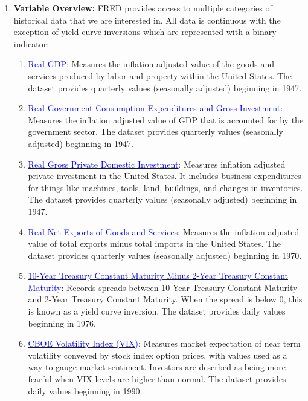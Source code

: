 \documentclass[11pt]{article}
\begin{document}
\begin{enumerate}[itemsep=0em,label={(\alph*)}]
\item \textbf{Variable Overview:} FRED provides access to multiple categories of historical data that we are interested in. All data is continuous with the exception of yield curve inversions which are represented with a binary indicator:
  \begin{enumerate}[itemsep=0em,label={\roman*.}]
    \item \href{https://fred.stlouisfed.org/series/GDPC1}{\underline{\textcolor{blue}{Real GDP}}}: Measures the inflation adjusted value of the goods and services produced by labor and property within the United States. The dataset provides quarterly values (seasonally adjusted) beginning in 1947.
    \item \href{https://fred.stlouisfed.org/series/GCEC1}{\underline{\textcolor{blue}{Real Government Consumption Expenditures and Gross Investment}}}: Measures the inflation adjusted value of GDP that is accounted for by the government sector. The dataset provides quarterly values (seasonally adjusted) beginning in 1947.
    \item \href{https://fred.stlouisfed.org/series/GPDIC1}{\underline{\textcolor{blue}{Real Gross Private Domestic Investment}}}: Measures inflation adjusted private investment in the United States. It includes business expenditures for things like machines, tools, land, buildings, and changes in inventories. The dataset provides quarterly values (seasonally adjusted) beginning in 1947.
    \item \href{https://fred.stlouisfed.org/series/NETEXC}{\underline{\textcolor{blue}{Real Net Exports of Goods and Services}}}: Measures the inflation adjusted value of total exports minus total imports in the United States. The dataset provides quarterly values (seasonally adjusted) beginning in 1970.
    \item \href{https://fred.stlouisfed.org/series/T10Y2Y}{\underline{\textcolor{blue}{10-Year Treasury Constant Maturity Minus 2-Year Treasury Constant Maturity}}}: Records spreads between 10-Year Treasury Constant Maturity and 2-Year Treasury Constant Maturity. When the spread is below 0, this is known as a yield curve inversion. The dataset provides daily values beginning in 1976.
    \item \href{https://fred.stlouisfed.org/series/VIXCLS}{\underline{\textcolor{blue}{CBOE Volatility Index (VIX)}}}: Measures market expectation of near term volatility conveyed by stock index option prices, with values used as a way to gauge market sentiment. Investors are descrbed as being more fearful when VIX levels are higher than normal. The dataset provides daily values beginning in 1990.

\end{enumerate}
\end{enumerate}
\end{document}
